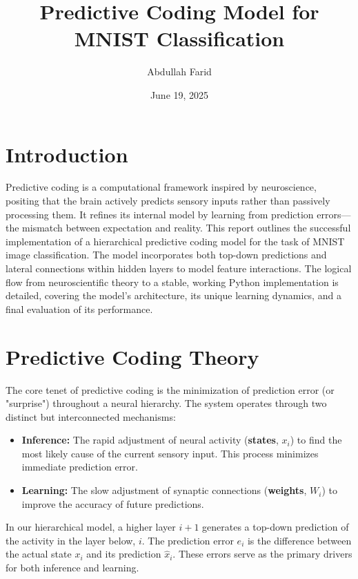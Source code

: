 \documentclass[a4paper,12pt]{article}
\begin{document}
\title{Predictive Coding Model for MNIST Classification}
\author{Abdullah Farid}
\date{June 19, 2025}
\maketitle

\section{Introduction}
Predictive coding is a computational framework inspired by neuroscience, positing that the brain actively predicts sensory inputs rather than passively processing them. It refines its internal model by learning from prediction errors—the mismatch between expectation and reality. This report outlines the successful implementation of a hierarchical predictive coding model for the task of MNIST image classification. The model incorporates both top-down predictions and lateral connections within hidden layers to model feature interactions. The logical flow from neuroscientific theory to a stable, working Python implementation is detailed, covering the model's architecture, its unique learning dynamics, and a final evaluation of its performance.

\section{Predictive Coding Theory}
The core tenet of predictive coding is the minimization of prediction error (or "surprise") throughout a neural hierarchy. The system operates through two distinct but interconnected mechanisms:

\begin{itemize}
    \item \textbf{Inference:} The rapid adjustment of neural activity (\textbf{states}, $x_i$) to find the most likely cause of the current sensory input. This process minimizes immediate prediction error.
    \item \textbf{Learning:} The slow adjustment of synaptic connections (\textbf{weights}, $W_i$) to improve the accuracy of future predictions.
\end{itemize}

In our hierarchical model, a higher layer $i+1$ generates a top-down prediction of the activity in the layer below, $i$. The prediction error $e_i$ is the difference between the actual state $x_i$ and its prediction $\hat{x}_i$. These errors serve as the primary drivers for both inference and learning.
\end{document}
